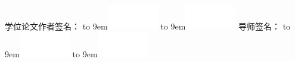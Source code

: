 {{  学位论文作者签名：
  \ifpdf
  {\hbox to 9em{\includegraphics[width=6em,height=3em]{./Signature/sign_cr_2.pdf}}}
  \else
  {\hbox to 9em{\includegraphics[width=6em,height=3em]{./Signature/sign_cr_2.eps}}}
  \fi
  导师签名：
  \ifpdf
  {\hbox to 9em{\includegraphics[width=6em,height=3em]{./Signature/sign_cr_s.pdf}}}
  \else
  {\hbox to 9em{\includegraphics[width=6em,height=3em]{./Signature/sign_cr_s.eps}}}
  \fi

  \vspace{2ex}

  \PutsigndateB
  \hspace{3em}
  \PutsigndateC}
  }
